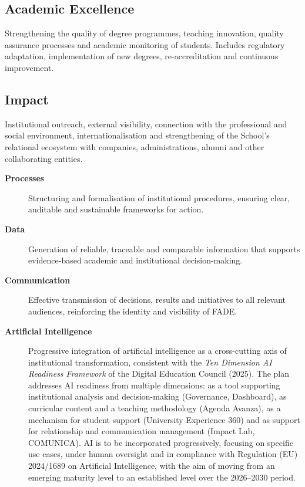 \documentclass[11pt,a4paper]{scrreprt}
\begin{document}
\subsection*{Academic Excellence}
\small Strengthening the quality of degree programmes, teaching innovation, quality assurance processes and academic monitoring of students. Includes regulatory adaptation, implementation of new degrees, re-accreditation and continuous improvement.

\subsection*{Impact}
\small Institutional outreach, external visibility, connection with the professional and social environment, internationalisation and strengthening of the School's relational ecosystem with companies, administrations, alumni and other collaborating entities.

\begin{description}
\item[\textbf{Processes}]
\small Structuring and formalisation of institutional procedures, ensuring clear, auditable and sustainable frameworks for action.
\item[\textbf{Data}]
\small Generation of reliable, traceable and comparable information that supports evidence-based academic and institutional decision-making.
\item[\textbf{Communication}]
\small Effective transmission of decisions, results and initiatives to all relevant audiences, reinforcing the identity and visibility of FADE.

\item[\textbf{Artificial Intelligence}]
\small Progressive integration of artificial intelligence as a cross-cutting axis of institutional transformation, consistent with the \textit{Ten Dimension AI Readiness Framework} of the Digital Education Council (2025). The plan addresses AI readiness from multiple dimensions: as a tool supporting institutional analysis and decision-making (Governance, Dashboard), as curricular content and a teaching methodology (Agenda Avanza), as a mechanism for student support (University Experience 360) and as support for relationship and communication management (Impact Lab, COMUNICA). AI is to be incorporated progressively, focusing on specific use cases, under human oversight and in compliance with Regulation (EU) 2024/1689 on Artificial Intelligence, with the aim of moving from an emerging maturity level to an established level over the 2026--2030 period.



\end{description}
\end{document}
